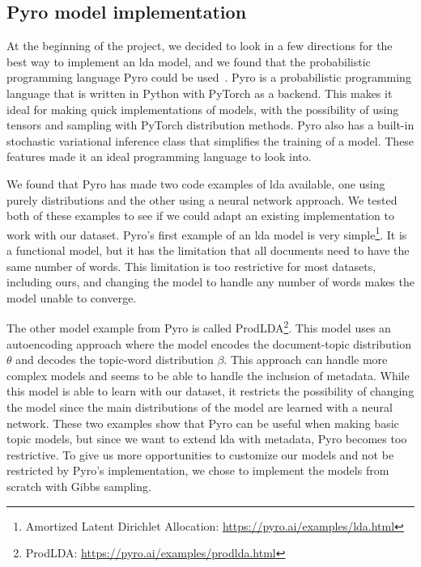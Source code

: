 \subsection{Pyro model implementation}
At the beginning of the project, we decided to look in a few directions for the best way to implement an \gls{lda} model, and we found that the probabilistic programming language Pyro could be used~\cite{bingham2019pyro}.
Pyro is a probabilistic programming language that is written in Python with PyTorch as a backend.
This makes it ideal for making quick implementations of models, with the possibility of using tensors and sampling with PyTorch distribution methods.
Pyro also has a built-in stochastic variational inference class that simplifies the training of a model.
These features made it an ideal programming language to look into.

We found that Pyro has made two code examples of \gls{lda} available, one using purely distributions and the other using a neural network approach.
We tested both of these examples to see if we could adapt an existing implementation to work with our dataset.
Pyro's first example of an \gls{lda} model is very simple\footnote{Amortized Latent Dirichlet Allocation: \url{https://pyro.ai/examples/lda.html}}.
It is a functional model, but it has the limitation that all documents need to have the same number of words.
This limitation is too restrictive for most datasets, including ours, and changing the model to handle any number of words makes the model unable to converge.

The other model example from Pyro is called ProdLDA\footnote{ProdLDA: \url{https://pyro.ai/examples/prodlda.html}}.
This model uses an autoencoding approach where the model encodes the document-topic distribution $\theta$ and decodes the topic-word distribution $\beta$.
This approach can handle more complex models and seems to be able to handle the inclusion of metadata.
While this model is able to learn with our dataset, it restricts the possibility of changing the model since the main distributions of the model are learned with a neural network.
These two examples show that Pyro can be useful when making basic topic models, but since we want to extend \gls{lda} with metadata, Pyro becomes too restrictive.
To give us more opportunities to customize our models and not be restricted by Pyro's implementation, we chose to implement the models from scratch with Gibbs sampling.
